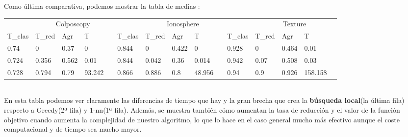 \documentclass[11pt]{article}
\begin{document}
Como última comparativa, podemos mostrar la tabla de medias :\\
\small\hspace{-2cm}\begin{tabular}{lllllllllllllll}
 & \multicolumn{4}{c}{Colposcopy}   &  & \multicolumn{4}{c}{Ionosphere}   &  & \multicolumn{4}{c}{Texture}        \\
 T\_clas & T\_red & Agr  & T      & & T\_clas & T\_red & Agr  & T      &  & T\_clas & T\_red & Agr   & T       \\
     0.74     & 0       & 0.37  & 0 &  & 0.844    & 0       & 0.422 & 0 &  & 0.928   & 0      & 0.464 & 0.01\\
     0.724   & 0.356  & 0.562 & 0.01 &  & 0.844   & 0.042  & 0.36 & 0.014 &  & 0.942   & 0.07   & 0.508 & 0.03\\
	 0.728   & 0.794  & 0.79 & 93.242 &  & 0.866   & 0.886  & 0.8  & 48.956 &  & 0.94    & 0.9    & 0.926 & 158.158\\
\end{tabular}\\

En esta tabla podemos ver claramente las diferencias de tiempo que hay y la gran brecha que crea la \textbf{búsqueda local}(la última fila) respecto a Greedy(2ª fila) y 1-nn(1ª fila). Además, se muestra también cómo aumentan la tasa de reducción y el valor de la función objetivo cuando aumenta la complejidad de nuestro algoritmo, lo que lo hace en el caso general mucho más efectivo aunque el coste computacional y de tiempo sea mucho mayor.
\end{document}
